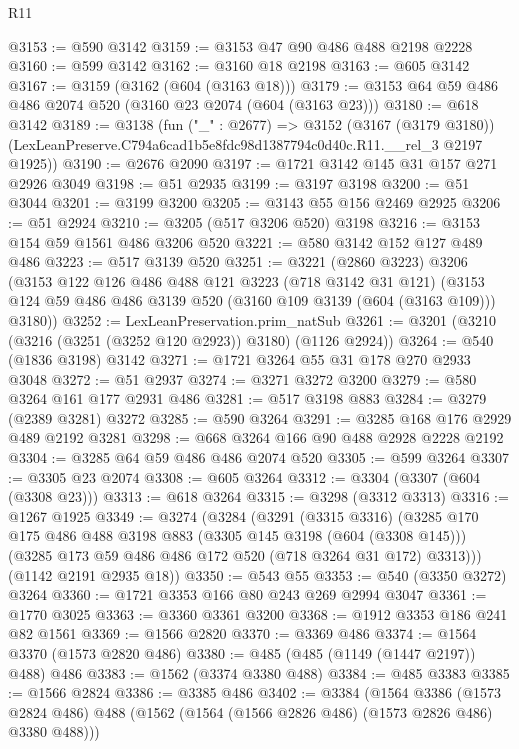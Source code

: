 \begin{lexlean}{R11}
\begin{coremodule}
@3153 := @590 @3142
@3159 := @3153 @47 @90 @486 @488 @2198 @2228
@3160 := @599 @3142
@3162 := @3160 @18 @2198
@3163 := @605 @3142
@3167 := @3159 (@3162 (@604 (@3163 @18)))
@3179 := @3153 @64 @59 @486 @486 @2074 @520 (@3160 @23 @2074 (@604 (@3163 @23)))
@3180 := @618 @3142
@3189 := @3138
    (fun ("_" : @2677) =>
    @3152
      (@3167 (@3179 @3180))
      (LexLeanPreserve.C794a6cad1b5e8fdc98d1387794c0d40c.R11.__rel_3 @2197 @1925))
@3190 := @2676 @2090
@3197 := @1721 @3142 @145 @31 @157 @271 @2926 @3049
@3198 := @51 @2935
@3199 := @3197 @3198
@3200 := @51 @3044
@3201 := @3199 @3200
@3205 := @3143 @55 @156 @2469 @2925
@3206 := @51 @2924
@3210 := @3205 (@517 @3206 @520) @3198
@3216 := @3153 @154 @59 @1561 @486 @3206 @520
@3221 := @580 @3142 @152 @127 @489 @486
@3223 := @517 @3139 @520
@3251 := @3221
    (@2860 @3223)
    @3206
    (@3153
      @122
      @126
      @486
      @488
      @121
      @3223
      (@718 @3142 @31 @121)
      (@3153 @124 @59 @486 @486 @3139 @520 (@3160 @109 @3139 (@604 (@3163 @109))) @3180))
@3252 := LexLeanPreservation.prim_natSub
@3261 := @3201 (@3210 (@3216 (@3251 (@3252 @120 @2923)) @3180) (@1126 @2924))
@3264 := @540 (@1836 @3198) @3142
@3271 := @1721 @3264 @55 @31 @178 @270 @2933 @3048
@3272 := @51 @2937
@3274 := @3271 @3272 @3200
@3279 := @580 @3264 @161 @177 @2931 @486
@3281 := @517 @3198 @883
@3284 := @3279 (@2389 @3281) @3272
@3285 := @590 @3264
@3291 := @3285 @168 @176 @2929 @489 @2192 @3281
@3298 := @668 @3264 @166 @90 @488 @2928 @2228 @2192
@3304 := @3285 @64 @59 @486 @486 @2074 @520
@3305 := @599 @3264
@3307 := @3305 @23 @2074
@3308 := @605 @3264
@3312 := @3304 (@3307 (@604 (@3308 @23)))
@3313 := @618 @3264
@3315 := @3298 (@3312 @3313)
@3316 := @1267 @1925
@3349 := @3274
    (@3284
      (@3291
        (@3315 @3316)
        (@3285
          @170
          @175
          @486
          @488
          @3198
          @883
          (@3305 @145 @3198 (@604 (@3308 @145)))
          (@3285 @173 @59 @486 @486 @172 @520 (@718 @3264 @31 @172) @3313)))
      (@1142 @2191 @2935 @18))
@3350 := @543 @55
@3353 := @540 (@3350 @3272) @3264
@3360 := @1721 @3353 @166 @80 @243 @269 @2994 @3047
@3361 := @1770 @3025
@3363 := @3360 @3361 @3200
@3368 := @1912 @3353 @186 @241 @82 @1561
@3369 := @1566 @2820
@3370 := @3369 @486
@3374 := @1564 @3370 (@1573 @2820 @486)
@3380 := @485 (@485 (@1149 (@1447 @2197)) @488) @486
@3383 := @1562 (@3374 @3380 @488)
@3384 := @485 @3383
@3385 := @1566 @2824
@3386 := @3385 @486
@3402 := @3384
    (@1564
      @3386
      (@1573 @2824 @486)
      @488
      (@1562 (@1564 (@1566 @2826 @486) (@1573 @2826 @486) @3380 @488)))

\end{coremodule}
\end{lexlean}
